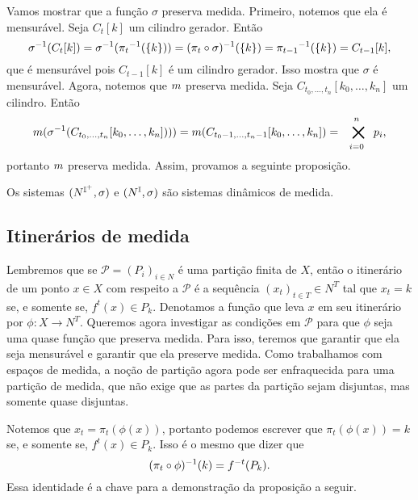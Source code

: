 Vamos mostrar que a função $\sigma$ preserva medida. Primeiro, notemos que ela é mensurável. Seja $C_t[k]$ um cilindro gerador. Então
	\begin{equation*}
	\sigma^{-1}(C_t[k]) = \sigma^{-1}({\pi_t}^{-1}(\{k\})) = (\pi_t \circ \sigma)^{-1}(\{k\}) = {\pi_{t-1}}^{-1}(\{k\}) = C_{t-1}[k],
	\end{equation*}
que é mensurável pois $C_{t-1}[k]$ é um cilindro gerador. Isso mostra que $\sigma$ é mensurável. Agora, notemos que $m$ preserva medida. Seja $C_{t_0,\ldots,t_n}[k_0,\ldots,k_n]$ um cilindro. Então
	\begin{equation*}
	\med(\sigma\inv(C_{t_0,\ldots,t_n}[k_0,\ldots,k_n]))) = \med(C_{t_0-1,\ldots,t_n-1}[k_0,\ldots,k_n]) = \bigtimes_{i=0}^n p_i,
	\end{equation*}
portanto $m$ preserva medida. Assim, provamos a seguinte proposição.

\begin{proposition}
Os sistemas $(N^{\mathbb{I}^+},\sigma)$ e $(N^{\mathbb{I}},\sigma)$ são sistemas dinâmicos de medida.
\end{proposition}

\subsection{Itinerários de medida}

Lembremos que se $\mathcal{P}=(P_i)_{i \in N}$ é uma partição finita de $X$, então o itinerário de um ponto $x \in X$ com respeito a $\mathcal{P}$ é a sequência $(x_t)_{t \in T} \in N^T$ tal que $x_t=k$ se, e somente se, $f^t(x) \in P_k$. Denotamos a função que leva $x$ em seu itinerário por $\phi: X \to N^T$. Queremos agora investigar as condições em $\mathcal{P}$ para que $\phi$ seja uma quase função que preserva medida. Para isso, teremos que garantir que ela seja mensurável e garantir que ela preserve medida. Como trabalhamos com espaços de medida, a noção de partição agora pode ser enfraquecida para uma partição de medida, que não exige que as partes da partição sejam disjuntas, mas somente quase disjuntas.

Notemos que $x_t = \pi_t(\phi(x))$, portanto podemos escrever que $\pi_t(\phi(x)) = k$ se, e somente se, $f^t(x) \in P_k$. Isso é o mesmo que dizer que
	\begin{equation*}
	(\pi_t \circ \phi)^{-1}(k) = f^{-t}(P_k).
	\end{equation*}
Essa identidade é a chave para a demonstração da proposição a seguir.

